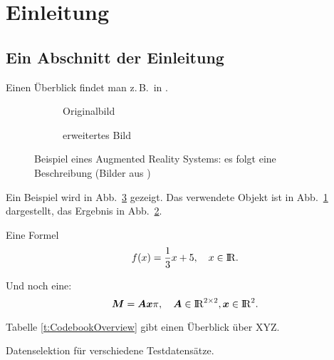 \section{Einleitung}
\label{s:intro}


\subsection{Ein Abschnitt der Einleitung}
\label{ss:intro:abc}

Einen Überblick findet man z.\,B.\ in \cite{Auer00:HTF}.

\begin{figure}[t]
\centering

\begin{subfigure}{0.45\linewidth}
\centering
\caption{Originalbild}
\label{FIG:arexorig}
\end{subfigure}
%
\begin{subfigure}{0.45\linewidth}
\centering
\caption{erweitertes Bild}
\label{FIG:arexaugm}
\end{subfigure}
%
\caption[AR Beispiel]
{Beispiel eines Augmented Reality Systems: es folgt eine Beschreibung (Bilder aus \cite{Schmidt01:PAO})}
\label{FIG:arex}
\end{figure}

Ein Beispiel wird in Abb.\ \ref{FIG:arex} gezeigt.
Das verwendete Objekt ist in Abb.\ \ref{FIG:arexorig} dargestellt, das Ergebnis in Abb.\ \ref{FIG:arexaugm}.

Eine Formel
\begin{equation}
\label{eq:cvp:test}
f(x) = \frac{1}{3} x + 5, \quad x \in \mathord{\mathrm{I\!R}}.
\end{equation}

Und noch eine:
\begin{equation}
\label{eq:cvp:matvec}
\bm{M}  = \bm{Ax} \pi, \quad \bm{A} \in \mathord{\mathrm{I\!R}}^{2 \times 2}, \bm{x} \in \mathord{\mathrm{I\!R}}^2.
\end{equation}

Tabelle \ref{t:CodebookOverview} gibt einen Überblick über XYZ.

\begin{table}[t]
\centering\small

 \caption[Testtabelle]{Datenselektion für verschiedene Testdatensätze.}
  \label{t:CodebookOverview}
\end{table}



